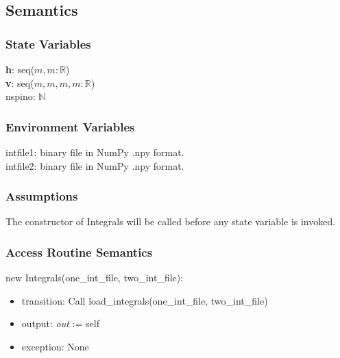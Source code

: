 \documentclass[12pt, titlepage]{article}
\begin{document}
\subsection{Semantics}

\subsubsection{State Variables}

\textbf{h}: seq($m,m:\mathbb{R}$)\\
\textbf{v}: seq($m,m,m,m:\mathbb{R}$)\\
nspino: $\mathbb{N}$

\subsubsection{Environment Variables}

intfile1: binary file in NumPy .npy format.\\
intfile2: binary file in NumPy .npy format.

\subsubsection{Assumptions}

The constructor of Integrals will be called before any state variable is 
invoked.

\subsubsection{Access Routine Semantics}

\noindent new Integrals(one\_int\_file, two\_int\_file):
\begin{itemize}
	\item transition: Call load\_integrals(one\_int\_file, 
	two\_int\_file)
	\item output: \textit{out} := self 
	\item exception: None 
\end{itemize}
\end{document}
